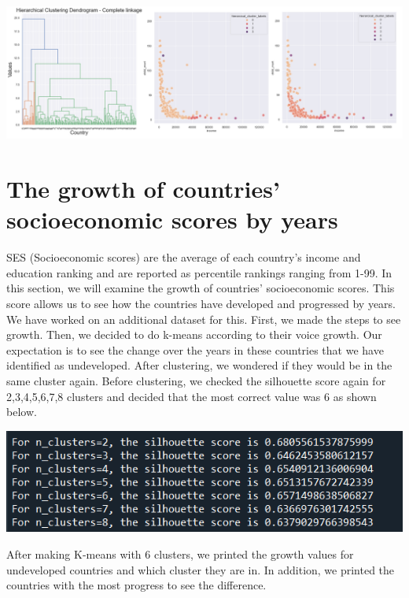 \documentclass[onecolumn]{article}
\begin{document}
\begin{center}
    \includegraphics[scale=0.50]{hierfinal.png}
\end{center}

\section{The growth of countries' socioeconomic scores by years}

SES (Socioeconomic scores) are the average of each country's income and education ranking and are reported as percentile rankings ranging from 1-99. In this section, we will examine the growth of countries' socioeconomic scores. This score allows us to see how the countries have developed and progressed by years. We have worked on an additional dataset for this. First, we made the steps to see growth. Then, we decided to do k-means according to their voice growth. Our expectation is to see the change over the years in these countries that we have identified as undeveloped. After clustering, we wondered if they would be in the same cluster again. Before clustering, we checked the silhouette score again for 2,3,4,5,6,7,8 clusters and decided that the most correct value was 6 as shown below.

\begin{center}
    \includegraphics[scale=0.90]{ses_silüet.PNG}
\end{center}

After making K-means with 6 clusters, we printed the growth values for undeveloped countries and which cluster they are in. In addition, we printed the countries with the most progress to see the difference.
\end{document}
